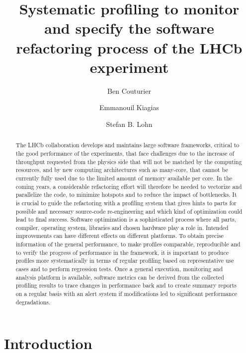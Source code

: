 \documentclass[a4paper]{jpconf}
\begin{document}
\title{Systematic profiling to monitor and specify the software refactoring process of the LHCb experiment}

\author{Ben Couturier}
\address{CERN, CH-1211 Geneva 23, Switzerland}

\author{Emmanouil Kiagias}
\address{CERN, CH-1211 Geneva 23, Switzerland}

\author{Stefan B. Lohn}
\address{CERN, CH-1211 Geneva 23, Switzerland}

\begin{abstract}
The LHCb collaboration develops and maintains large software frameworks, critical to the good performance of the experiments, that face challenges due to the increase of throughput requested from the physics side that will not be matched by the computing resources, and by new computing architectures such as many-core, that cannot be currently fully used due to the limited amount of memory available per core. In the coming years, a considerable refactoring effort will therefore be needed to vectorize and parallelize the code, to minimize hotspots and to reduce the impact of bottlenecks. It is crucial to guide the refactoring with a profiling system that gives hints to parts for possible and necessary source-code re-engineering and which kind of optimization could lead to final success.
\newline
Software optimization is a sophisticated process where all parts, compiler, operating system, libraries and chosen hardware play a role in. Intended improvements can have different effects on different platforms. To obtain precise information of the general performance, to make profiles comparable, reproducible and to verify the progress of performance in the framework, it is important to produce profiles more systematically in terms of regular profiling based on representative use cases and to perform regression tests. Once a general execution, monitoring and analysis platform is available, software metrics can be derived from the collected profiling results to trace changes in performance back and to create summary reports on a regular basis with an alert system if modifications led to significant performance degradations.
\end{abstract}

\section{Introduction}
\label{sec:introduction}
\end{document}
